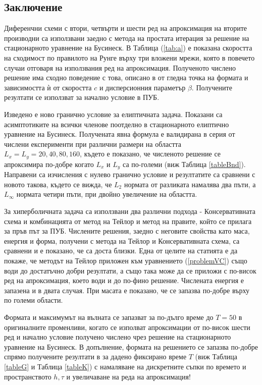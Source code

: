 \documentclass[a5paper]{article}
\newcommand{\rf}[1]{(\ref{#1})}
\theoremstyle{remark}
\begin{document}
\begin{normalsize}
\section{Заключение}

Диференчни схеми с втори, четвърти и шести ред на апроксимация на вторите производни са използвани заедно с метода на простата итерация за решение на стационарното уравнение на Бусинеск. В Таблица \rf{tab:a} е показана скоростта на сходимост по правилото на Рунге върху три вложени мрежи, която в повечето случаи отговаря на използвания ред на апроксимация. Полученото числено решение има сходно поведение с това, описано в \cite{ref117,ref116} от гледна точка на формата и зависимостта ѝ от скоростта $c$ и дисперсионния параметър $\beta$. Получените резултати се използват за начално условие в ПУБ.

Изведено е ново гранично условие за елиптичната задача. Показани са асимптотиките на всички членове поотделно в стационарното елиптично уравнение на Бусинеск. Получената явна формула е валидирана в серия от числени експерименти при различни размери на областта $L_x=L_y=20,40,80,160$, където е показано, че численото решение се апроксимира по-добре когато $L_x$ и $L_y$ са по-големи (виж Таблица \ref{tableBnd}). Направени са изчисления с нулево гранично условие и резултатите са сравнени с новото такова, където се вижда, че $L_2$ нормата от разликата намалява два пъти, а $L_\infty$ нормата четири пъти, при двойно увеличение на областта.

За хиперболичната задача са използвани два различни подхода - Консервативната схема и комбинацията от метод на Тейлор и метод на правите, който се прилага за пръв път за ПУБ. Числените решения, заедно с неговите свойства като маса, енергия и форма, получени с метода на Тейлор и Консервативната схема, са сравнени и е показано, че са доста близки. Една от целите на статията е да покаже, че методът на Тейлор приложен към уравнението \rf{problemVC} също води до достатъчно добри резултати, а също така може да се приложи с по-висок ред на апроксимация, което води и до по-фино решение. Числената енергия е запазена и в двата случая. При масата е показано, че се запазва по-добре върху по големи области. 

Формата и максимумът на вълната се запазват за по-дълго време до $T=50$ в оригиналните променливи, когато се изполват апроксимации от по-висок шести ред и начално условие получено числено чрез решение на стационарното уравнение на Бусинеск. В допълнение, формата на решението се запазва по-добре спрямо получените резултати в \cite{ref21, ref20, ref23, ref22, ref25} за дадено фиксирано време $T$ (виж Таблица \ref{tableG} и Таблица \ref{tableK}) с намаляване на дискретните съпки по времето и пространството $h, \tau$ и увеличаване на реда на апроксимация!


\end{normalsize}
\end{document}
